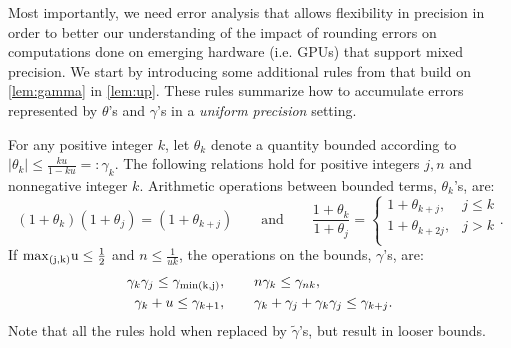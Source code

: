 \documentclass[review,onefignum,onetabnum]{siamart190516}
\newcommand{\tth}{\theta}
\begin{document}
Most importantly, we need error analysis that allows flexibility in precision in order to better our understanding of the impact of rounding errors on computations done on emerging hardware (i.e. GPUs) that support mixed precision. 
We start by introducing some additional rules from \cite{Higham2002} that build on \cref{lem:gamma} in \cref{lem:up}. 
These rules summarize how to accumulate errors represented by $\tth$'s and $\gamma$'s in a \emph{uniform precision} setting.

\begin{lemma}
	\label{lem:up}
	For any positive integer $k$, let $\tth_{k}$ denote a quantity bounded according to $|\tth_{k}|\leq \frac{k u }{1-ku} =:\gamma_{k}$. The following relations hold for positive integers $j,n$ and nonnegative integer $k$.
	Arithmetic operations between bounded terms, $\tth_{k}$'s, are: 
	\begin{equation}
	(1+\tth_{k})(1+\tth_{j})=(1+\tth_{k+j})\qquad \mbox{and} \qquad\frac{1+\tth_{k}}{1+\tth_{j}} =
	\begin{cases}
	1+\tth_{k+j},& j \leq k\\
	1+\tth_{k+2j},& j > k\\
	\end{cases} .
	\end{equation}
	If $\rm{max}_{(j,k)} u \leq \frac{1}{2}$ and $n \leq \frac{1}{uk}$, the operations on the bounds, $\gamma$'s, are:
	\begin{align*}
	\gamma_{k}\gamma_{j} \leq \gamma_{\rm{min}(k,j)}&,\qquad n\gamma_{k} \leq \gamma_{nk},\\
	\gamma_{k} + u \leq \gamma_{k+1}&,\qquad \gamma_{k}+\gamma_{j}+\gamma_{k}\gamma_{j} \leq \gamma_{k+j}.
	\end{align*}
	Note that all the rules hold when replaced by $\tilde{\gamma}$'s, but result in looser bounds.
\end{lemma}
\end{document}
